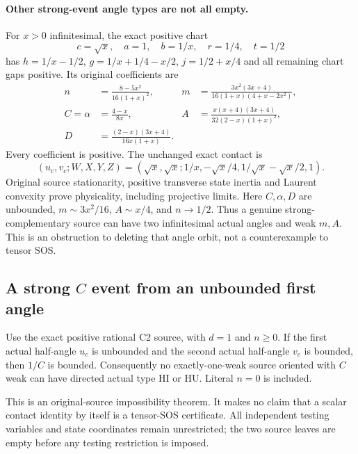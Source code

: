 \paragraph{Other strong-event angle types are not all empty.}
For $x>0$ infinitesimal, the exact positive chart
\[
 c=\sqrt x,\quad a=1,\quad b=1/x,\quad r=1/4,\quad t=1/2
\]
has $h=1/x-1/2$, $g=1/x+1/4-x/2$, $j=1/2+x/4$ and all
remaining chart gaps positive. Its original coefficients are
\begin{align*}
 n&=\frac{8-5x^2}{16(1+x)^2},&
 m&=\frac{3x^2(3x+4)}{16(1+x)(4+x-2x^2)},\\
 C=\alpha&=\frac{4-x}{8x},&
 A&=\frac{x(x+4)(3x+4)}{32(2-x)(1+x)^2},\\
 D&=\frac{(2-x)(3x+4)}{16x(1+x)}.
\end{align*}
Every coefficient is positive. The unchanged exact contact is
\[
 (u_c,v_c;W,X,Y,Z)
 =(\sqrt x,\sqrt x;1/x,-\sqrt x/4,1/\sqrt x-\sqrt x/2,1).
\]
Original source stationarity, positive transverse state inertia and
Laurent convexity prove physicality, including projective limits.
Here $C,\alpha,D$ are unbounded, $m\sim3x^2/16$, $A\sim x/4$,
and $n\to1/2$. Thus a genuine strong-complementary source can have
two infinitesimal actual angles and weak $m,A$. This is an obstruction
to deleting that angle orbit, not a counterexample to tensor SOS.

\subsection{A strong $C$ event from an unbounded first angle}
\label{component:pb7189b9c1f6e}

\label{pb7189b9c1f6e:sec:c2-weak-hi-hu-empty}

\begin{theorem}
Use the exact positive rational C2 source, with $d=1$ and $n\geq0$.
If the first actual half-angle $u_c$ is unbounded and the second
actual half-angle $v_c$ is bounded, then $1/C$ is bounded.
Consequently no exactly-one-weak source oriented with $C$ weak can
have directed actual type HI or HU.  Literal $n=0$ is included.
\end{theorem}

This is an original-source impossibility theorem.  It makes no
claim that a scalar contact identity by itself is a tensor-SOS
certificate.  All independent testing variables and state coordinates
remain unrestricted; the two source leaves are empty before any
testing restriction is imposed.

